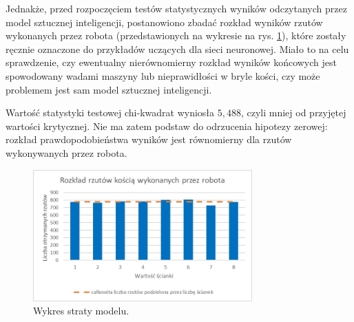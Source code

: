 Jednakże, przed rozpoczęciem testów statystycznych wyników odczytanych przez model sztucznej inteligencji, postanowiono zbadać
rozkład wyników rzutów wykonanych przez robota (przedstawionych na wykresie na rys. \ref{fig:robot-wykres}), które 
zostały ręcznie oznaczone do przykładów uczących dla sieci neuronowej. Miało to na celu sprawdzenie, czy ewentualny 
nierównomierny rozkład wyników końcowych jest spowodowany wadami maszyny lub nieprawidłości w bryle kości, czy może 
problemem jest sam model sztucznej inteligencji. 

Wartość statystyki testowej chi-kwadrat wyniosła \begin{math} 5{,}488 \end{math}, czyli mniej od przyjętej wartości krytycznej.
Nie ma zatem podstaw do odrzucenia hipotezy zerowej: rozkład prawdopodobieństwa wyników jest równomierny dla rzutów
wykonywanych przez robota.

\begin{figure}[H]
    \centering
    \includegraphics[width=0.75\textwidth]{chapters/06-testy/figures/robot-rzuty.jpg}
    \caption{Wykres straty modelu.}
    \label{fig:robot-wykres}
\end{figure}




